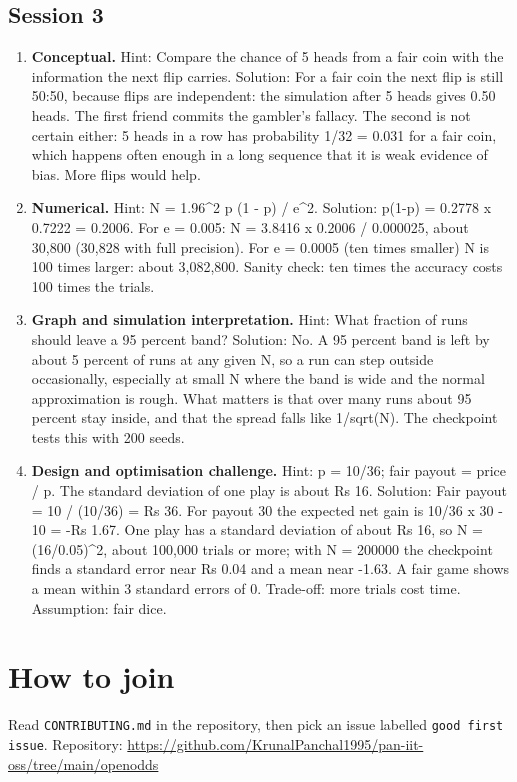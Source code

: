 \documentclass[11pt,a4paper]{article}
\begin{document}
\subsection*{Session 3}
\begin{enumerate}[nosep]
\item \textbf{Conceptual.} Hint: Compare the chance of 5 heads from a fair coin with the information the next flip carries. Solution: For a fair coin the next flip is still 50:50, because flips are independent: the simulation after 5 heads gives 0.50 heads. The first friend commits the gambler's fallacy. The second is not certain either: 5 heads in a row has probability 1/32 = 0.031 for a fair coin, which happens often enough in a long sequence that it is weak evidence of bias. More flips would help.
\item \textbf{Numerical.} Hint: N = 1.96\textasciicircum{}2 p (1 - p) / e\textasciicircum{}2. Solution: p(1-p) = 0.2778 x 0.7222 = 0.2006. For e = 0.005: N = 3.8416 x 0.2006 / 0.000025, about 30,800 (30,828 with full precision). For e = 0.0005 (ten times smaller) N is 100 times larger: about 3,082,800. Sanity check: ten times the accuracy costs 100 times the trials.
\item \textbf{Graph and simulation interpretation.} Hint: What fraction of runs should leave a 95 percent band? Solution: No. A 95 percent band is left by about 5 percent of runs at any given N, so a run can step outside occasionally, especially at small N where the band is wide and the normal approximation is rough. What matters is that over many runs about 95 percent stay inside, and that the spread falls like 1/sqrt(N). The checkpoint tests this with 200 seeds.
\item \textbf{Design and optimisation challenge.} Hint: p = 10/36; fair payout = price / p. The standard deviation of one play is about Rs 16. Solution: Fair payout = 10 / (10/36) = Rs 36. For payout 30 the expected net gain is 10/36 x 30 - 10 = -Rs 1.67. One play has a standard deviation of about Rs 16, so N = (16/0.05)\textasciicircum{}2, about 100,000 trials or more; with N = 200000 the checkpoint finds a standard error near Rs 0.04 and a mean near -1.63. A fair game shows a mean within 3 standard errors of 0. Trade-off: more trials cost time. Assumption: fair dice.
\end{enumerate}

\section{How to join}
Read \texttt{CONTRIBUTING.md} in the repository, then pick an issue labelled \texttt{good first issue}. Repository: \url{https://github.com/KrunalPanchal1995/pan-iit-oss/tree/main/openodds}
\end{document}

